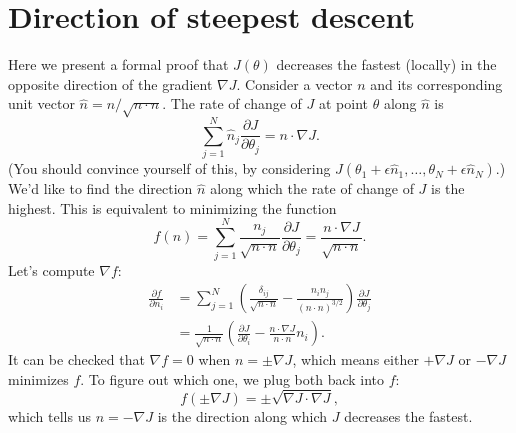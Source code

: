 \documentclass{article}
\theoremstyle{definition}
\begin{document}
\section{Direction of steepest descent}
\label{app-section:gd}
Here we present a formal proof that $J(\theta)$ decreases the fastest (locally) in the opposite direction of the gradient $\nabla J$. Consider a vector $n$ and its corresponding unit vector $\hat{n}=n/\sqrt{n\cdot n}$. The rate of change of $J$ at point $\theta$ along $\hat{n}$ is
\begin{equation*}
    \sum_{j=1}^N\hat{n}_j\frac{\partial J}{\partial\theta_j} = n \cdot \nabla J.
\end{equation*}
(You should convince yourself of this, by considering $J(\theta_1+\epsilon \hat{n}_1, \dots, \theta_N+\epsilon \hat{n}_N)$.) We'd like to find the direction $\hat{n}$ along which the rate of change of $J$ is the highest. This is equivalent to minimizing the function
\begin{equation*}
    f(n) = \sum_{j=1}^N\frac{n_j}{\sqrt{n\cdot n}}\frac{\partial J}{\partial\theta_j} = \frac{n\cdot \nabla J}{\sqrt{n\cdot n}}.
\end{equation*}
Let's compute $\nabla f$:
\begin{align}
    \frac{\partial f}{\partial n_i} &= \sum_{j=1}^N\left(\frac{\delta_{ij}}{\sqrt{n\cdot n}}-\frac{n_in_j}{(n\cdot n)^{3/2}}\right)\frac{\partial J}{\partial\theta_j}\\
    &= \frac{1}{\sqrt{n\cdot n}}\left(\frac{\partial J}{\partial\theta_i}-\frac{n\cdot \nabla J}{n\cdot n}n_i\right).
\end{align}
It can be checked that $\nabla f = 0$ when $n=\pm \nabla J$, which means either $+\nabla J$ or $-\nabla J$ minimizes $f$. To figure out which one, we plug both back into $f$:
\begin{equation*}
    f(\pm \nabla J) = \pm \sqrt{\nabla J \cdot \nabla J},
\end{equation*}
which tells us $n=-\nabla J$ is the direction along which $J$ decreases the fastest.
\end{document}

